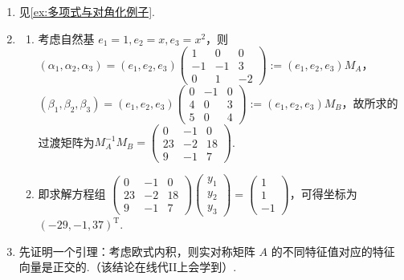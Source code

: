 \begin{enumerate}
    由于 $\dfrac{3}{2}T(\alpha_1) - \dfrac{1}{2}T(\alpha_2) = \alpha_1 + 2\alpha_2 = T(\alpha_3)$，故 $\im T = \spa\{\alpha_1+\alpha_2, \alpha_1 - \alpha_2\}$. $r(T) = 2$.
    \item 见\autoref{ex:多项式与对角化例子}.
    \item \begin{enumerate}
        \item 考虑自然基 $e_1=1,e_2=x,e_3=x^2$，则 $(\alpha_1,\alpha_2,\alpha_3)=(e_1,e_2,e_3)\begin{pmatrix}
            1 & 0 & 0 \\
            -1 & -1 & 3 \\
            0 & 1 & -2
        \end{pmatrix}:=(e_1,e_2,e_3)M_A$，$(\beta_1,\beta_2,\beta_3)=(e_1,e_2,e_3)\begin{pmatrix}
            0 & -1 & 0 \\
            4 & 0 & 3 \\
            5 & 0 & 4
        \end{pmatrix}:=(e_1,e_2,e_3)M_B$，故所求的过渡矩阵为$M_A^{-1}M_B = \begin{pmatrix}
            0 & -1 & 0 \\
            23 & -2 & 18 \\
            9 & -1 & 7
        \end{pmatrix}$.

        \item 即求解方程组 $\begin{pmatrix}
            0 & -1 & 0 \\
            23 & -2 & 18 \\
            9 & -1 & 7
        \end{pmatrix}\begin{pmatrix}
            y_1 \\ y_2 \\ y_3
        \end{pmatrix}=\begin{pmatrix}
            1 \\ 1 \\ -1
        \end{pmatrix}$，可得坐标为 $(-29,-1,37)^\mathrm{T}$.
    \end{enumerate}

    \item 先证明一个引理：考虑欧式内积，则实对称矩阵 $A$ 的不同特征值对应的特征向量是正交的.（该结论在线代II上会学到）.


\end{enumerate}
